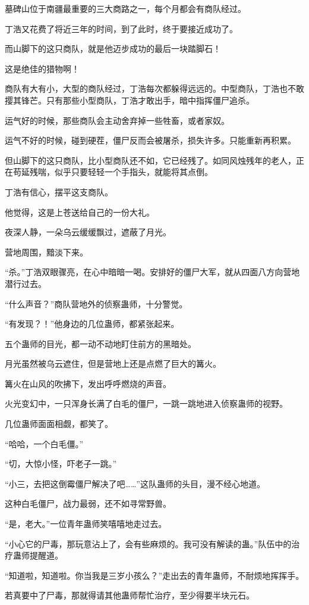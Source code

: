 \begin{this_body}
墓碑山位于南疆最重要的三大商路之一，每个月都会有商队经过。

丁浩又花费了将近三年的时间，到了此时，终于要接近成功了。

而山脚下的这只商队，就是他迈步成功的最后一块踏脚石！

这是绝佳的猎物啊！

商队有大有小，大型的商队经过，丁浩每次都躲得远远的。中型商队，丁浩也不敢撄其锋芒。只有那些小型商队，丁浩才敢出手，暗中指挥僵尸追杀。

运气好的时候，那些商队会主动舍弃掉一些牲畜，或者家奴。

运气不好的时候，碰到硬茬，僵尸反而会被屠杀，损失许多。只能重新再积累。

但山脚下的这只商队，比小型商队还不如，它已经残了。如同风烛残年的老人，正在苟延残喘，似乎只要轻轻一个手指头，就能将其点倒。

丁浩有信心，摆平这支商队。

他觉得，这是上苍送给自己的一份大礼。

夜深人静，一朵乌云缓缓飘过，遮蔽了月光。

营地周围，黯淡下来。

“杀。”丁浩双眼骤亮，在心中暗暗一喝。安排好的僵尸大军，就从四面八方向营地潜行过去。

“什么声音？”商队营地外的侦察蛊师，十分警觉。

“有发现？！”他身边的几位蛊师，都紧张起来。

五个蛊师的目光，都一动不动地盯住前方的黑暗处。

月光虽然被乌云遮住，但是营地上还是点燃了巨大的篝火。

篝火在山风的吹拂下，发出呼呼燃烧的声音。

火光变幻中，一只浑身长满了白毛的僵尸，一跳一跳地进入侦察蛊师的视野。

几位蛊师面面相觑，都笑了。

“哈哈，一个白毛僵。”

“切，大惊小怪，吓老子一跳。”

“小三，去把这倒霉僵尸解决了吧……”这队蛊师的头目，漫不经心地道。

这种白毛僵尸，战力最弱，还不如寻常野兽。

“是，老大。”一位青年蛊师笑嘻嘻地走过去。

“小心它的尸毒，那玩意沾上了，会有些麻烦的。我可没有解读的蛊。”队伍中的治疗蛊师提醒道。

“知道啦，知道啦。你当我是三岁小孩么？”走出去的青年蛊师，不耐烦地挥挥手。

若真要中了尸毒，那就得请其他蛊师帮忙治疗，至少得要半块元石。


\end{this_body}
